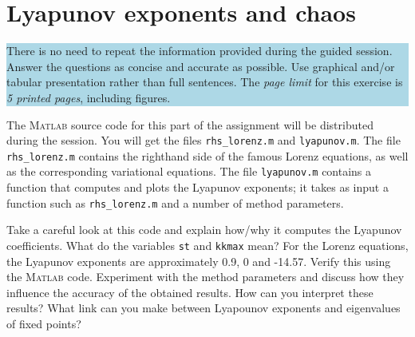 \chapter{Lyapunov exponents and chaos}

\begin{center}
\colorbox{LightBlue}{\parbox{1\textwidth}{ There is no need to repeat the information provided during the guided session. Answer the questions as concise and accurate as possible. Use graphical and/or tabular presentation rather than full sentences. The \textit{page limit} for this exercise is \textit{5 printed pages}, including figures.}}
\end{center}


\begin{Exercise}[name=Lyapunov exponents of the Lorenz Equations]
The \textsc{Matlab} source code for this part of the assignment will be distributed during the session. You will get the files \verb$rhs_lorenz.m$ and \verb$lyapunov.m$.  The file \verb$rhs_lorenz.m$ contains the righthand side of the famous Lorenz equations, as well as the corresponding variational
equations.  The file \verb$lyapunov.m$ contains a function that computes and plots the Lyapunov exponents; it takes as input a
function such as \verb$rhs_lorenz.m$ and a number of method parameters.

\Question Take a careful look at this code and explain how/why it computes the Lyapunov coefficients.  What do the variables \verb$st$ and
\verb$kkmax$ mean?  For the Lorenz equations, the Lyapunov exponents are approximately 0.9, 0 and -14.57. Verify this using the \textsc{Matlab} code. Experiment with the method parameters and discuss how they influence the accuracy of the obtained results.
\Question How can you interpret these results? What link can you make between Lyapounov exponents and eigenvalues of fixed points?

\end{Exercise}

